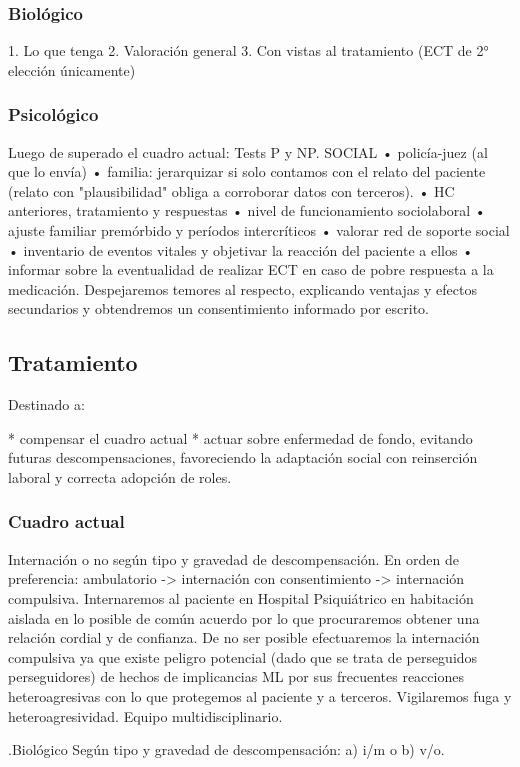 \documentclass{scrbook}
\begin{document}
\subsubsection*{Biológico}
1. Lo que tenga
2. Valoración general
3. Con vistas al tratamiento (ECT de 2° elección únicamente)
\subsubsection{Psicológico}
Luego de superado el cuadro actual: Tests P y NP. SOCIAL • policía-juez (al que lo envía) • familia: jerarquizar si solo contamos con el relato del paciente (relato con "plausibilidad" obliga a corroborar datos con terceros). • HC anteriores, tratamiento y respuestas • nivel de funcionamiento sociolaboral • ajuste familiar premórbido y períodos intercríticos • valorar red de soporte social • inventario de eventos vitales y objetivar la reacción del paciente a ellos • informar sobre la eventualidad de realizar ECT en caso de pobre respuesta a la medicación. Despejaremos temores al respecto, explicando ventajas y efectos secundarios y obtendremos un consentimiento informado por escrito.
\subsection*{Tratamiento}
Destinado a:

* compensar el cuadro actual
* actuar sobre enfermedad de fondo, evitando futuras descompensaciones, favoreciendo la adaptación social con reinserción laboral y correcta adopción de roles.
\subsubsection*{Cuadro actual}

Internación o no según tipo y gravedad de descompensación. En orden de preferencia: ambulatorio -> internación con consentimiento -> internación compulsiva. Internaremos al paciente en Hospital Psiquiátrico en habitación aislada en lo posible de común acuerdo por lo que procuraremos obtener una relación cordial y de confianza. De no ser posible efectuaremos la internación compulsiva ya que existe peligro potencial (dado que se trata de perseguidos perseguidores) de hechos de implicancias ML por sus frecuentes reacciones heteroagresivas con lo que protegemos al paciente y a terceros. Vigilaremos fuga y heteroagresividad. Equipo multidisciplinario.

.Biológico
Según tipo y gravedad de descompensación: a) i/m o b) v/o.
\end{document}
